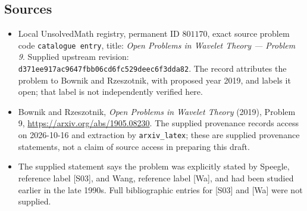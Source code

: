 \documentclass[11pt]{article}
\begin{document}
\subsection{Sources}
\begin{itemize}
\item Local UnsolvedMath registry, permanent ID \(801170\), exact source problem code \texttt{catalogue entry}, title: \emph{Open Problems in Wavelet Theory --- Problem 9}. Supplied upstream revision: \texttt{d371ee917ac9647fbb06cd6fc529deec6f3dda82}. The record attributes the problem to Bownik and Rzeszotnik, with proposed year 2019, and labels it open; that label is not independently verified here.
\item Bownik and Rzeszotnik, \emph{Open Problems in Wavelet Theory} (2019), Problem 9, \url{https://arxiv.org/abs/1905.08230}. The supplied provenance records access on 2026-10-16 and extraction by \texttt{arxiv\_latex}; these are supplied provenance statements, not a claim of source access in preparing this draft.
\item The supplied statement says the problem was explicitly stated by Speegle, reference label [S03], and Wang, reference label [Wa], and had been studied earlier in the late 1990s. Full bibliographic entries for [S03] and [Wa] were not supplied.
\end{itemize}
\end{document}
